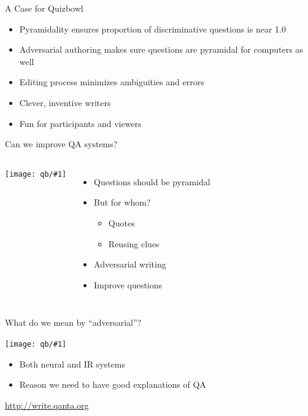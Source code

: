 \documentclass[xcolor=dvipsnames,xcolor=table]{beamer}
\newcommand{\fsi}[2]{
\begin{frame}[plain]
\vspace*{-1pt}
\makebox[\linewidth]{\texttt{[image: \#1]}}
\begin{center}
#2
\end{center}
\end{frame}
}
\newcommand{\gfxq}[2]{
\begin{center}
	\texttt{[image: qb/\#1]}
\end{center}
}
\begin{document}
\begin{frame}{A Case for Quizbowl}

  \begin{itemize}
    \item Pyramidality ensures proportion of discriminative questions is near 1.0
    \item Adversarial authoring makes sure questions are pyramidal for computers as well
    \item Editing process minimizes ambiguities and errors
    \item Clever, inventive writers
    \item Fun for participants and viewers
  \end{itemize}
\end{frame}
\begin{frame}{Can we improve QA systems?}

\begin{columns}
     \gfxq{trick/pyramid}{.9}
     \begin{itemize}
       \item Questions should be pyramidal
       \item But for whom?
         \begin{itemize}
           \item Quotes
           \item Reusing clues
         \end{itemize}
         \item Adversarial writing
         \item Improve questions
     \end{itemize}
\end{columns}
\end{frame}

\begin{frame}{What do we mean by ``adversarial''?}

  \gfxq{trick/flow_chart_horizontal_label}{1.0}

  \begin{itemize}
    \item Both neural and IR systems
      \pause
    \item Reason we need to have good explanations of QA
  \end{itemize}

\end{frame}

\fsi{qb/trick/brahms_0}{\href{http://write.qanta.org}{http://write.qanta.org}}
\fsi{qb/trick/brahms_1}{}
\fsi{qb/trick/brahms_2}{}
\fsi{qb/trick/brahms_3}{}
\fsi{qb/trick/brahms_4}{}
\fsi{qb/trick/brahms_5}{}
\end{document}
